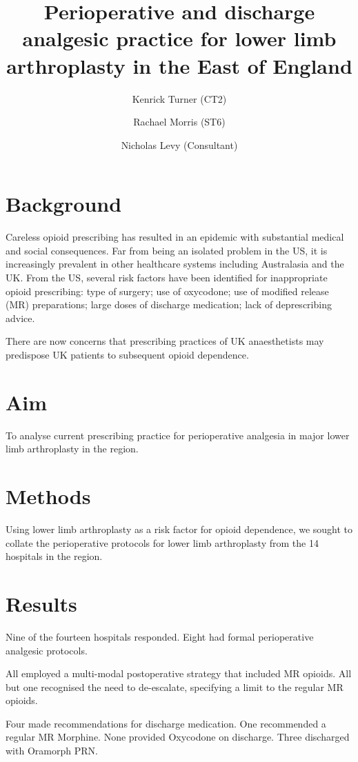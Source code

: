\documentclass[11pt, a4paper]{article}
\title{Perioperative and discharge analgesic practice for lower limb arthroplasty in the East of England}
\author[$\dag$]{Kenrick Turner (CT2)}
\author[$\dag$]{Rachael Morris (ST6)}
\author[$\dag$]{Nicholas Levy (Consultant)}
\affil[$\dag$]{Department of Anaesthesia, West Suffolk Hospital NHS Foundation Trust}
\date{}
\begin{document}
\maketitle

\section*{Background}
Careless opioid prescribing has resulted in an epidemic with substantial medical and social consequences. Far from being an isolated problem in the US, it is increasingly prevalent in other healthcare systems including Australasia and the UK. From the US, several risk factors have been identified for inappropriate opioid prescribing: type of surgery; use of oxycodone; use of modified release (MR) preparations; large doses of discharge medication; lack of deprescribing advice.\cite{Shah:2017kn}

There are now concerns that prescribing practices of UK anaesthetists may predispose UK patients to subsequent opioid dependence.\cite{Levy:vWXr4C3m}

\section*{Aim}

To analyse current prescribing practice for perioperative analgesia in major lower limb arthroplasty in the region.

\section*{Methods}
Using lower limb arthroplasty as a risk factor for opioid dependence, we sought to collate the perioperative protocols for lower limb arthroplasty from the 14 hospitals in the region.

\section*{Results}
Nine of the fourteen hospitals responded. Eight had formal perioperative analgesic protocols.

All employed a multi-modal postoperative strategy that included MR opioids. All but one recognised the need to de-escalate, specifying a limit to the regular MR opioids.

Four made recommendations for discharge medication. One recommended a regular MR Morphine. None provided Oxycodone on discharge. Three discharged with Oramorph PRN.
\end{document}
